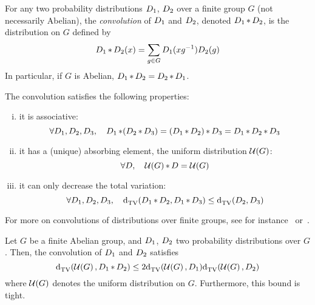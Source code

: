 \begin{definition}
For any two probability distributions $D_1$, $D_2$ over a finite group $G$ (not necessarily Abelian), the \emph{convolution} of $D_1$ and $D_2$, denoted $D_1\operatorname{\ast} D_2$, is the distribution on $G$ defined by
\[
  D_1\operatorname{\ast} D_2(x) = \sum_{g\in G} D_1(x g^{-1})D_2(g)
\]
In particular, if $G$ is Abelian, $D_1\operatorname{\ast} D_2=D_2\operatorname{\ast} D_1$.
\end{definition}
\begin{fact}
The convolution satisfies the following properties:
\begin{enumerate}[(i)]
  \item it is associative:
    \begin{equation}
      \forall D_1,D_2,D_3, \quad D_1\operatorname{\ast} (D_2\operatorname{\ast} D_3) = (D_1\operatorname{\ast} D_2)\operatorname{\ast} D_3 = D_1\operatorname{\ast} D_2\operatorname{\ast} D_3
    \end{equation}
  \item it has a (unique) absorbing element, the uniform distribution $\mathcal{U}\!\left( G \right) $:
    \begin{equation}
      \forall D, \quad \mathcal{U}\!\left( G \right) \operatorname{\ast} D = \mathcal{U}\!\left( G \right) 
    \end{equation}
  \item it can only decrease the total variation:
    \begin{equation}
      \forall D_1,D_2,D_3, \quad {\operatorname{d}_{\textrm{TV}}^{}\!\left({ \ensuremath{D}_1\operatorname{\ast}\ensuremath{D}_2 ,  \ensuremath{D}_1\operatorname{\ast}\ensuremath{D}_3 }\right)} \leq {\operatorname{d}_{\textrm{TV}}^{}\!\left({ \ensuremath{D}_2 ,  \ensuremath{D}_3 }\right)}
    \end{equation}
  \end{enumerate}
\end{fact}
\noindent For more on convolutions of distributions over finite groups, see for instance~\cite{Diaconis:88} or~\cite{BCLR:08}.

\begin{fact}\label{fact:convol:uniform:tv}
Let $G$ be a finite Abelian group, and $D_1$, $D_2$ two probability distributions over $G$. Then, the convolution of $D_1$ and $D_2$ satisfies
\begin{equation}\label{eq:convol:uniform:tv}
  {\operatorname{d}_{\textrm{TV}}^{}\!\left({ \ensuremath{\mathcal{U}\!\left( G \right) } ,  \ensuremath{D}_1\operatorname{\ast}\ensuremath{D}_2 }\right)} \leq 2{\operatorname{d}_{\textrm{TV}}^{}\!\left({ \mathcal{U}\!\left( G \right)  ,  D_1 }\right)}{\operatorname{d}_{\textrm{TV}}^{}\!\left({ \mathcal{U}\!\left( G \right)  ,  D_2 }\right)}
\end{equation}
where $\mathcal{U}\!\left( G \right) $ denotes the uniform distribution on $G$. Furthermore, this bound is tight.
\end{fact}


